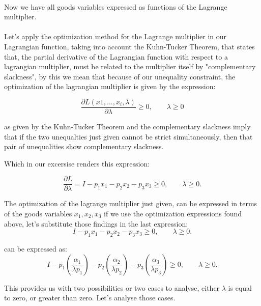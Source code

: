 \documentclass{article}
\begin{document}
\paragraph{}
Now we have all goods variables expressed as functions of the Lagrange multiplier.
\paragraph{}
 Let's apply the optimization method for the Lagrange multiplier in our Lagrangian function, taking into account the Kuhn-Tucker Theorem, that states that, the partial derivative of the Lagrangian function with respect to a lagrangian multiplier, must be related to the multiplier itself by "complementary slackness", by this we mean that because of our unequality constraint, the optimization of the lagrangian multiplier is given by the expression:

\begin{equation}
  \frac{\partial L(x1, ..., x_i, \lambda)}{\partial \lambda} \geq 0, \qquad \lambda \geq 0
\end{equation}

as given by the Kuhn-Tucker Theorem and the complementary slackness imply that if the two unequalties just given cannot be strict simultaneously, then that pair of unequalities show complementary slackness.

Which in our excersise renders this expression:

\begin{equation}
  \frac{\partial L}{\partial \lambda} = I - p_1x_1 - p_2x_2 - p_3x_3 \geq 0, \qquad \lambda \geq 0.
\end{equation}

The optimization of the lagrange multiplier just given, can be expressed in terms of the goods variables $x_1, x_2, x_3 $ if we use the optimization expressions found above, let's substitute those findings in the last expression:
\begin{equation}\label{cou}
   I - p_1x_1 - p_2x_2 - p_3x_3 \geq 0, \qquad \lambda \geq 0.
\end{equation}

can be expressed as:
\begin{equation}
   I - p_1 \left( \frac{\alpha_1}{\lambda p_1} \right) - p_2 \left( \frac{\alpha_2}{\lambda p_2} \right) - p_3 \left( \frac{\alpha_3}{\lambda p_3} \right) \geq 0, \qquad \lambda \geq 0.
\end{equation}

This provides us with two possibilities or two cases to analyse, either $\lambda$ is equal to zero, or greater than zero. Let's analyse those cases.
\end{document}
